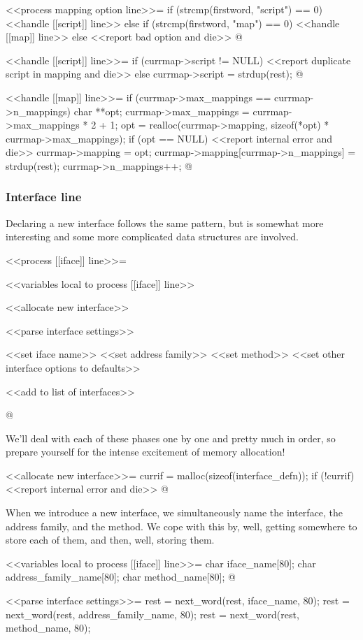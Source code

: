 \documentclass{article}
\begin{document}
<<process mapping option line>>=
if (strcmp(firstword, "script") == 0) {
	<<handle [[script]] line>>
} else if (strcmp(firstword, "map") == 0) {
	<<handle [[map]] line>>
} else {
	<<report bad option and die>>
}
@ 

<<handle [[script]] line>>=
if (currmap->script != NULL) {
	<<report duplicate script in mapping and die>>
} else {
	currmap->script = strdup(rest);
}
@ 

<<handle [[map]] line>>=
if (currmap->max_mappings == currmap->n_mappings) {
	char **opt;
	currmap->max_mappings = currmap->max_mappings * 2 + 1;
	opt = realloc(currmap->mapping, sizeof(*opt) * currmap->max_mappings);
	if (opt == NULL) {
		<<report internal error and die>>
	}
	currmap->mapping = opt;
}
currmap->mapping[currmap->n_mappings] = strdup(rest);
currmap->n_mappings++;
@ 

\subsubsection{Interface line}

Declaring a new interface follows the same pattern, but is somewhat more
interesting and some more complicated data structures are involved.

<<process [[iface]] line>>=
{
	<<variables local to process [[iface]] line>>

	<<allocate new interface>>

	<<parse interface settings>>

	<<set iface name>>
	<<set address family>>
	<<set method>>
	<<set other interface options to defaults>>

	<<add to list of interfaces>>
}
@ 

We'll deal with each of these phases one by one and pretty much in
order, so prepare yourself for the intense excitement of memory
allocation!

<<allocate new interface>>=
currif = malloc(sizeof(interface_defn));
if (!currif) {
	<<report internal error and die>>
}
@ 

When we introduce a new interface, we simultaneously name the
interface, the address family, and the method. We cope with this by,
well, getting somewhere to store each of them, and then, well, storing
them.

<<variables local to process [[iface]] line>>=
char iface_name[80];
char address_family_name[80];
char method_name[80];
@ 

<<parse interface settings>>=
rest = next_word(rest, iface_name, 80);
rest = next_word(rest, address_family_name, 80);
rest = next_word(rest, method_name, 80);
\end{document}
